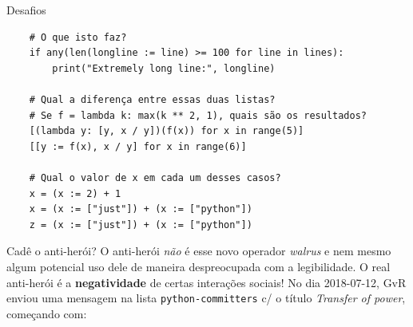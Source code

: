 \documentclass[utf8]{beamer}
\begin{document}
\begin{frame}[fragile]{Desafios}
  \begin{verbatim}
    # O que isto faz?
    if any(len(longline := line) >= 100 for line in lines):
        print("Extremely long line:", longline)

    # Qual a diferença entre essas duas listas?
    # Se f = lambda k: max(k ** 2, 1), quais são os resultados?
    [(lambda y: [y, x / y])(f(x)) for x in range(5)]
    [[y := f(x), x / y] for x in range(6)]

    # Qual o valor de x em cada um desses casos?
    x = (x := 2) + 1
    x = (x := ["just"]) + (x := ["python"])
    z = (x := ["just"]) + (x := ["python"])

  \end{verbatim}
\end{frame}


\begin{frame}{Cadê o anti-herói?}
  O anti-herói \emph{não} é esse novo operador \emph{walrus}
  e nem mesmo algum potencial uso dele
  de maneira despreocupada com a legibilidade.
  O real anti-herói é a \textbf{negatividade}
  de certas interações sociais!
  \vfill
  No dia 2018-07-12,
  GvR enviou uma mensagem na lista \texttt{python-committers}
  c/ o título \emph{Transfer of power}, começando com:
  \vfill
\end{frame}
\end{document}
